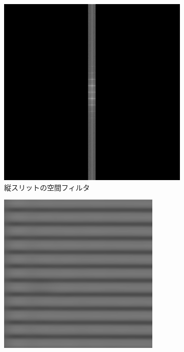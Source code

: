\documentclass[titlepage]{jsarticle}
\begin{document}
\begin{figure}[htbp]
    \centering
    \begin{subfigure}{0.38\columnwidth}
        \centering
        \includegraphics[width=\columnwidth]{20um_blue2_fft_vfilter.png}
        \caption{縦スリットの空間フィルタ}
        \label{fig:fourier_vslit_filter}
    \end{subfigure}
    \begin{subfigure}{0.38\columnwidth}
        \centering
        \includegraphics[width=\columnwidth]{20um_blue2_fft_vfilter_invfft_tri.png}

\end{subfigure}
\end{figure}
\end{document}
